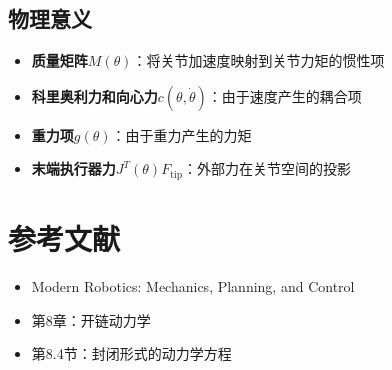 \documentclass[12pt,a4paper]{article}
\begin{document}
\subsection{物理意义}

\begin{itemize}
\item \textbf{质量矩阵}$M(\theta)$：将关节加速度映射到关节力矩的惯性项
\item \textbf{科里奥利力和向心力}$c(\theta, \dot{\theta})$：由于速度产生的耦合项
\item \textbf{重力项}$g(\theta)$：由于重力产生的力矩
\item \textbf{末端执行器力}$J^T(\theta)F_{\text{tip}}$：外部力在关节空间的投影
\end{itemize}

\section{参考文献}

\begin{itemize}
\item Modern Robotics: Mechanics, Planning, and Control
\item 第8章：开链动力学
\item 第8.4节：封闭形式的动力学方程
\end{itemize}
\end{document}
